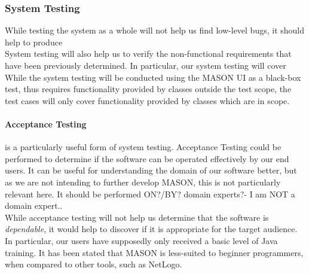 \documentclass[11pt]{article}
\begin{document}



\subsubsection{System Testing}
While testing the system as a whole will not help us find low-level bugs, it should help to produce 
\\

System testing will also help us to verify the non-functional requirements that have been previously determined.
In particular, our system testing will cover
\\

While the system testing will be conducted using the MASON UI as a black-box test, thus requires functionality provided by classes outside the test scope, the test cases will only cover functionality provided by classes which are in scope.

\paragraph{Acceptance Testing}
is a particularly useful form of system testing.
Acceptance Testing could be performed to determine if the software can be operated effectively by our end users.
It can be useful for understanding the domain of our software better, but as we are not intending to further develop MASON, this is not particularly relevant here.
It should be performed ON?/BY? domain experts?- I am NOT a domain expert..
\\

While acceptance testing will not help us determine that the software is \textit{dependable}, it would help to discover if it is appropriate for the target audience. In particular, our users have supposedly only received a basic level of Java training. It has been stated that MASON is less-suited to beginner programmers, when compared to other tools, such as NetLogo\cite{abm_platforms_review}.
\end{document}
